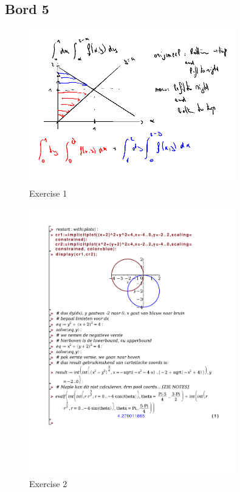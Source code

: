 \documentclass[a4paper]{article}
\begin{document}
\subsection*{Bord 5}


\begin{figure}[H]
	\centering
	\includegraphics[width=0.8\textwidth]{assets/bord_5_ex_1.png}
	\caption{Exercise 1}
	\label{fig:bord_5_ex_1}
\end{figure}

\begin{figure}[H]
	\centering
	\includegraphics[width=0.8\textwidth]{exercises/bord_5_ex_2.pdf}
	\caption{Exercise 2}
	\label{fig:bord_5_ex_2_maple}
\end{figure}
\end{document}

